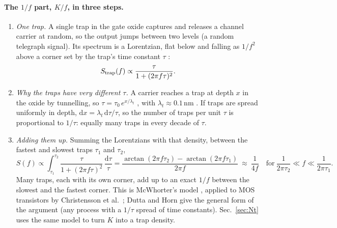 \documentclass[10pt,a4paper]{article}
\begin{document}
\paragraph{The $1/f$ part, $K/f$, in three steps.}
\begin{enumerate}
\item \emph{One trap.} A single trap in the gate oxide captures and releases a channel carrier at random, so the
output jumps between two levels (a random telegraph signal). Its spectrum is a Lorentzian, flat below and falling as
$1/f^2$ above a corner set by the trap's time constant $\tau$ \cite{machlup1954,kirton1989}:
\begin{equation}
S_{\rm trap}(f)\propto\frac{\tau}{1+(2\pi f\tau)^2}.
\end{equation}
\item \emph{Why the traps have very different $\tau$.} A carrier reaches a trap at depth $x$ in the oxide by
tunnelling, so $\tau=\tau_0\,e^{x/\lambda_t}$ \cite{mcwhorter1957,christensson1968}, with $\lambda_t\approx0.1$\,nm
\cite{ghibaudo2022}.
If traps are spread uniformly in depth, $\mathrm dx=\lambda_t\,\mathrm d\tau/\tau$, so the number of traps per unit
$\tau$ is proportional to $1/\tau$: equally many traps in every decade of $\tau$.
\item \emph{Adding them up.} Summing the Lorentzians with that density, between the fastest and slowest traps
$\tau_1$ and $\tau_2$,
\begin{equation}
S(f)\propto\int_{\tau_1}^{\tau_2}\frac{\tau}{1+(2\pi f\tau)^2}\,\frac{\mathrm d\tau}{\tau}
=\frac{\arctan(2\pi f\tau_2)-\arctan(2\pi f\tau_1)}{2\pi f}\ \approx\ \frac{1}{4f}
\quad\text{for}\ \frac1{2\pi\tau_2}\ll f\ll\frac1{2\pi\tau_1}.
\end{equation}
Many traps, each with its own corner, add up to an exact $1/f$ between the slowest and the fastest corner. This is
McWhorter's model \cite{mcwhorter1957}, applied to MOS transistors by Christensson et al.\ \cite{christensson1968};
Dutta and Horn \cite{dutta1981} give the general form of the argument (any process with a $1/\tau$ spread of time
constants). Sec.~\ref{sec:Nt} uses the same model to turn $K$ into a trap density.
\end{enumerate}
\end{document}
